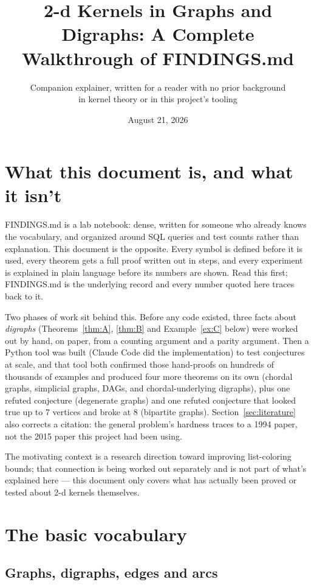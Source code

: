 \documentclass[11pt]{article}
\title{2-d Kernels in Graphs and Digraphs: A Complete Walkthrough of FINDINGS.md}
\author{Companion explainer, written for a reader with no prior background\\ in kernel theory or in this project's tooling}
\date{August 21, 2026}
\theoremstyle{plain}
\theoremstyle{definition}
\theoremstyle{remark}
\begin{document}
\maketitle
\tableofcontents

\section{What this document is, and what it isn't}

FINDINGS.md is a lab notebook: dense, written for someone who already knows the
vocabulary, and organized around SQL queries and test counts rather than explanation.
This document is the opposite. Every symbol is defined before it is used, every
theorem gets a full proof written out in steps, and every experiment is explained in
plain language before its numbers are shown. Read this first; FINDINGS.md is the
underlying record and every number quoted here traces back to it.

Two phases of work sit behind this. Before any code existed, three facts about
\emph{digraphs} (Theorems~\ref{thm:A}, \ref{thm:B} and Example~\ref{ex:C} below) were
worked out by hand, on paper, from a counting argument and a parity argument. Then a
Python tool was built (Claude Code did the implementation) to test conjectures at
scale, and that tool both confirmed those hand-proofs on hundreds of thousands of
examples and produced four more theorems on its own (chordal graphs, simplicial
graphs, DAGs, and chordal-underlying digraphs), plus one refuted conjecture
(degenerate graphs) and one refuted conjecture that looked true up to 7 vertices and
broke at 8 (bipartite graphs). Section~\ref{sec:literature} also corrects a citation:
the general problem's hardness traces to a 1994 paper, not the 2015 paper this project
had been using.

The motivating context is a research direction toward improving list-coloring bounds;
that connection is being worked out separately and is not part of what's explained
here — this document only covers what has actually been proved or tested about
2-d kernels themselves.

\section{The basic vocabulary}

\subsection{Graphs, digraphs, edges and arcs}
\end{document}
